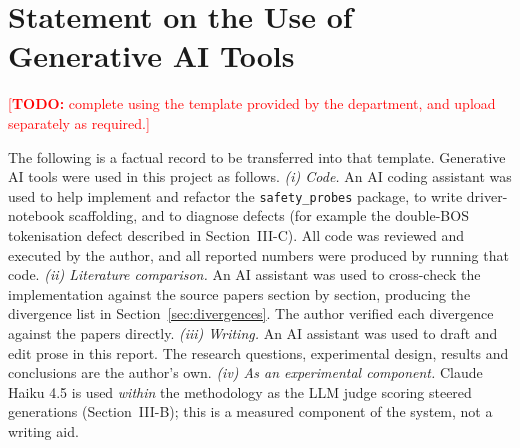 \documentclass[conference]{IEEEtran}
\newcommand{\TODO}[1]{\textcolor{red}{[\textbf{TODO:} #1]}}
\begin{document}
\section{Statement on the Use of Generative AI Tools}
\TODO{complete using the template provided by the department, and upload
separately as required.}

The following is a factual record to be transferred into that template.
Generative AI tools were used in this project as follows.
\emph{(i) Code.} An AI coding assistant was used to help implement and refactor
the \texttt{safety\_probes} package, to write driver-notebook scaffolding, and
to diagnose defects (for example the double-BOS tokenisation defect described in
Section~III-C). All code was reviewed and executed by the author, and all
reported numbers were produced by running that code.
\emph{(ii) Literature comparison.} An AI assistant was used to cross-check the
implementation against the source papers section by section, producing the
divergence list in Section~\ref{sec:divergences}. The author verified each
divergence against the papers directly.
\emph{(iii) Writing.} An AI assistant was used to draft and edit prose in this
report. The research questions, experimental design, results and conclusions are
the author's own.
\emph{(iv) As an experimental component.} Claude Haiku 4.5 is used
\emph{within} the methodology as the LLM judge scoring steered generations
(Section~III-B); this is a measured component of the system, not a writing aid.
\end{document}
